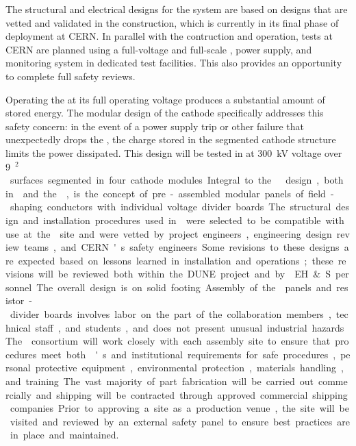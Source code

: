 
The structural and electrical designs for the   system are based on designs that are vetted and validated in the  construction, which is currently in its final phase of deployment at CERN. In parallel with the  contruction and operation,   tests at CERN are planned using %
a full-voltage and full-scale  \fdth, power supply, and monitoring system in dedicated  test facilities. This also provides an opportunity %
to complete full safety reviews. 

Operating the  at its full operating voltage produces a substantial amount of stored energy. The modular design of the cathode specifically addresses this safety concern: in the event of a power supply trip or other failure that unexpectedly drops the , the charge stored in the segmented cathode structure limits the power dissipated. 
This design will be tested in  at \SI{300}{kV} voltage over \SI{9}{\m$^2$} surfaces segmented in four cathode modules.  

Integral to the   design, both in  and the \dpmod, is the concept of pre-assembled modular panels of field-shaping conductors with individual voltage divider boards. The structural design and installation procedures used in  were selected to be compatible with use at the  site and were vetted by project engineers, engineering design review teams, and CERN's safety engineers. Some revisions to these designs are expected based on lessons learned in installation and operations; these revisions will be reviewed both within the DUNE project and by \fnal EH\&S personnel. The overall design is on solid footing. 

Assembly of the  panels and resistor-divider boards involves labor on the part of the collaboration members, technical staff, and students, and  does not present unusual industrial hazards. The  consortium will work closely with each assembly site to ensure that procedures meet both \fnal{}'s and institutional requirements for safe procedures, personal protective equipment, environmental protection, %
materials handling, and training. The vast majority of %
part fabrication will be carried out commercially and shipping will be contracted through approved commercial shipping companies. Prior to approving a site as a production venue, the site will be visited and reviewed by an external safety panel to ensure best practices are in place and maintained. 

